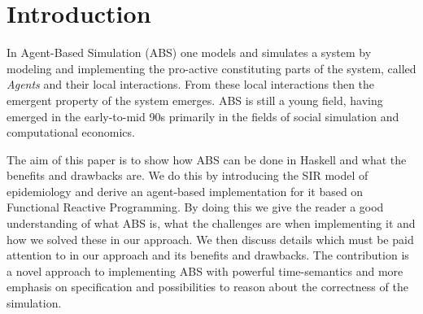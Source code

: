 \section{Introduction}

In Agent-Based Simulation (ABS) one models and simulates a system by modeling and implementing the pro-active constituting parts of the system, called \textit{Agents} and their local interactions. From these local interactions then the emergent property of the system emerges. ABS is still a young field, having emerged in the early-to-mid 90s primarily in the fields of social simulation and computational economics. 

The aim of this paper is to show how ABS can be done in Haskell and what the benefits and drawbacks are. We do this by introducing the SIR model of epidemiology and derive an agent-based implementation for it based on Functional Reactive Programming. By doing this we give the reader a good understanding of what ABS is, what the challenges are when implementing it and how we solved these in our approach. We then discuss details which must be paid attention to in our approach and its benefits and drawbacks. The contribution is a novel approach to implementing ABS with powerful time-semantics and more emphasis on specification and possibilities to reason about the correctness of the simulation.